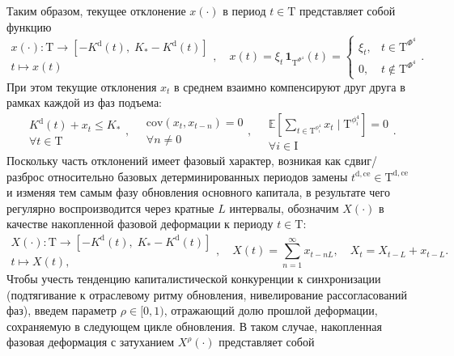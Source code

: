 Таким образом, текущее отклонение $x(\cdot)$ в период $t \in \mathrm{T}$ представляет собой функцию
\begin{equation}\begin{aligned} x(\cdot) : \mathrm{T} \longrightarrow \left[-K^{\mathrm{d}}(t), \; K_{*} - K^{\mathrm{d}}(t) \right] \\ t \longmapsto x(t) \end{aligned}, \quad x(t) = \xi_{t} \, \mathbf{1}_{\mathrm{T}^{\Phi^{4}}}(t) = \begin{cases} \xi_{t}, &t \in \mathrm{T}^{\Phi^{4}} \\ 0, &t \not\in \mathrm{T}^{\Phi^{4}} \end{cases}.\end{equation}
При этом текущие отклонения $x_{t}$ в среднем взаимно компенсируют друг друга в рамках каждой из фаз подъема:
\begin{equation}\begin{aligned} K^{\mathrm{d}}(t) + x_{t} \leq K_{*} \\ \forall t \in \mathrm{T} \end{aligned}, \quad \begin{aligned} \mathrm{cov}(x_{t},x_{t-n})=0 \\ \forall n\neq 0 \end{aligned}, \quad \begin{aligned} \mathbb E\left[\sum_{t \in \mathrm{T}^{\phi^{4}_{i}}} x_{t} \mid \mathrm{T}^{\phi^{4}_{i}} \right] = 0 \\ \forall i \in \mathrm{I} \end{aligned}.\end{equation}
Поскольку часть отклонений имеет фазовый характер, возникая как сдвиг/разброс относительно базовых детерминированных периодов замены $t^{\mathrm{d,ce}} \in \mathrm{T}^{\mathrm{d,ce}}$ и изменяя тем самым фазу обновления основного капитала, в результате чего регулярно воспроизводится через кратные $L$ интервалы, обозначим $X(\cdot)$ в качестве накопленной фазовой деформации к периоду $t \in \mathrm{T}$:
\begin{equation}\begin{aligned} X(\cdot) : \mathrm{T} \longrightarrow \left[-K^{\mathrm{d}}(t), \; K_{*} - K^{\mathrm{d}}(t) \right] \\ t \longmapsto X(t), \end{aligned}, \quad X(t) = \sum_{n=1}^{\infty} x_{t-nL}, \quad X_{t} = X_{t-L} + x_{t-L}.\end{equation}
Чтобы учесть тенденцию капиталистической конкуренции к синхронизации (подтягивание к отраслевому ритму обновления, нивелирование рассогласований фаз), введем параметр $\rho\in[0,1)$, отражающий долю прошлой деформации, сохраняемую в следующем цикле обновления. В таком случае, накопленная фазовая деформация с затуханием $X^{\rho}(\cdot)$ представляет собой
